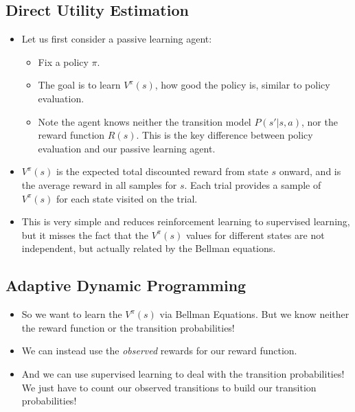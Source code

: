 \documentclass{article}
\begin{document}
\subsection{Direct Utility Estimation}
\begin{itemize}
    \item Let us first consider a passive learning agent:
        \begin{itemize}
            \item Fix a policy $\pi$.
            \item The goal is to learn $V^{\pi}(s)$, how good the policy is, similar to policy evaluation.
            \item Note the agent knows neither the transition model $P(s' | s, a)$, nor the reward function $R(s)$.  This is the key difference between policy evaluation and our passive learning agent.
        \end{itemize}
    \item $V^{\pi}(s)$ is the expected total discounted reward from state $s$ onward, and is the average reward in all samples for $s$.  Each trial provides a sample of $V^{\pi}(s)$ for each state visited on the trial.
    \item This is very simple and reduces reinforcement learning to supervised learning, but it misses the fact that the $V^{\pi}(s)$ values for different states are not independent, but actually related by the Bellman equations.
\end{itemize}

\subsection{Adaptive Dynamic Programming}
\begin{itemize}
    \item So we want to learn the $V^{\pi}(s)$ via Bellman Equations.  But we know neither the reward function or the transition probabilities!
    \item We can instead use the \emph{observed} rewards for our reward function.
    \item And we can use supervised learning to deal with the transition probabilities! We just have to count our observed transitions to build our transition probabilities! 
\end{itemize}
\end{document}
